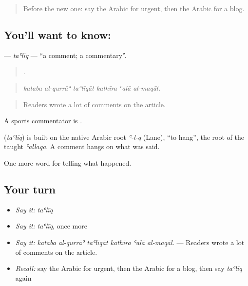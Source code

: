 \label{lesson:AR-C355-taliq}



\begin{quote}
Before the new one: say the Arabic for urgent, then the Arabic for a blog.
\end{quote}

\subsection*{You'll want to know: }
\textbf{} — \emph{taʿlīq} — \textquotedblleft{}a comment; a commentary\textquotedblright{}.

\begin{quote}
     .
\end{quote}

\begin{quote}
\emph{kataba al-qurrāʾ taʿlīqāt kathīra ʿalā al-maqāl.}
\end{quote}

\begin{quote}
Readers wrote a lot of comments on the article.
\end{quote}

A sports commentator is .

\begin{cousinweb}
\textbf{} (\emph{taʿlīq}) is built on the native Arabic root \emph{ʿ-l-q} (Lane), \textquotedblleft{}to hang\textquotedblright{}, the root of the taught \emph{ʿallaqa}. A comment hangs on what was said.
\end{cousinweb}

\begin{grammarlens}[title={What you've built}]
One more word for telling what happened.
\end{grammarlens}

\subsection*{Your turn}
\begin{itemize}
\raggedright
  \item \emph{Say it:} \emph{taʿlīq}
  \item \emph{Say it:} \emph{taʿlīq}, once more
  \item \emph{Say it:} \emph{kataba al-qurrāʾ taʿlīqāt kathīra ʿalā al-maqāl.} — Readers wrote a lot of comments on the article.
  \item \emph{Recall:} say the Arabic for urgent, then the Arabic for a blog, then say \emph{taʿlīq} again
\end{itemize}

